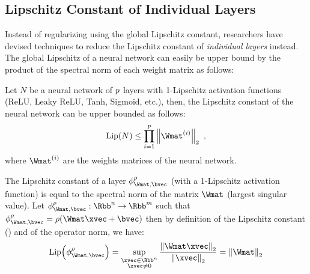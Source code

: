 \subsection{Lipschitz Constant of Individual Layers}
\label{subsection:ch3-lipschitz_constant_of_individual_layers}

\noindent
Instead of regularizing using the global Lipschitz constant, researchers have devised techniques to reduce the Lipschitz constant of \emph{individual layers} instead. 
The global Lipschitz of a neural network can easily be upper bound by the product of the spectral norm of each weight matrix as follows:
\begin{proposition} \label{proposition:ch3-naive_upper_bound_lipschitz}
  Let $N$ be a neural network of $p$ layers with 1-Lipschitz activation functions (\eg ReLU,
  Leaky ReLU, Tanh, Sigmoid, etc.), then, the Lipschitz constant of the neural network can be upper bounded as follows:
  \begin{equation} \label{equation:ch3-naive_upper_bound_lipschitz}
    \lip{N} \leq \prod_{i=1}^\depth \norm{\Wmat^{(i)}}_2 \enspace,
  \end{equation}
  where $\Wmat^{(i)}$ are the weights matrices of the neural network.
\end{proposition}

\begin{remark}
  The Lipschitz constant of a layer $\layer_{\Wmat, \bvec}^\rho$ (with a 1-Lipschitz activation function) is equal to the spectral norm of the matrix $\Wmat$ (largest singular value).
  Let $\layer_{\Wmat, \bvec}^\rho: \Rbb^n \rightarrow \Rbb^m$ such that $\layer_{\Wmat, \bvec}^\rho = \rho(\Wmat \xvec + \bvec)$ then by definition of the Lipschitz constant () and of the operator norm, we have:
  \begin{equation}
    \lip{\layer_{\Wmat, \bvec}^\rho} = \sup_{\substack{\xvec \in \Rbb^n \\ \xvec \neq 0}} \frac{\norm{\Wmat \xvec}_2}{\norm{\xvec}_2} = \norm{\Wmat}_2
  \end{equation}
  \removespace
\end{remark}

